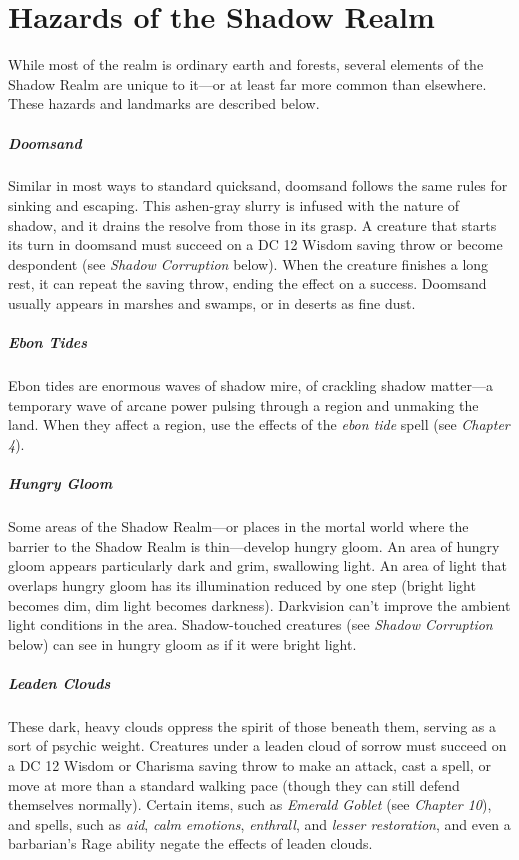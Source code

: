 \documentclass[10pt,a4paper,twoside,bg=print,twocolumn,openany,nodeprecatedcode]{dndbook}
\begin{document}
\section{Hazards of the Shadow Realm}
While most of the realm is ordinary earth and forests, several elements of the Shadow Realm are unique to it—or at least far more common than elsewhere. These hazards and landmarks are described below.

\subparagraph{Doomsand}
Similar in most ways to standard quicksand, doomsand follows the same rules for sinking and escaping. This ashen-gray slurry is infused with the nature of shadow, and it drains the resolve from those in its grasp. A creature that starts its turn in doomsand must succeed on a DC 12 Wisdom saving throw or become despondent (see \textit{Shadow Corruption} below). When the creature finishes a long rest, it can repeat the saving throw, ending the effect on a success. Doomsand usually appears in marshes and swamps, or in deserts as fine dust.

\subparagraph{Ebon Tides}
Ebon tides are enormous waves of shadow mire, of crackling shadow matter—a temporary wave of arcane power pulsing through a region and unmaking the land. When they affect a region, use the effects of the \textit{ebon tide} spell (see \textit{Chapter 4}).

\subparagraph{Hungry Gloom}
Some areas of the Shadow Realm—or places in the mortal world where the barrier to the Shadow Realm is thin—develop hungry gloom. An area of hungry gloom appears particularly dark and grim, swallowing light. An area of light that overlaps hungry gloom has its illumination reduced by one step (bright light becomes dim, dim light becomes darkness). Darkvision can't improve the ambient light conditions in the area. Shadow-touched creatures (see \textit{Shadow Corruption} below) can see in hungry gloom as if it were bright light.

\subparagraph{Leaden Clouds}
These dark, heavy clouds oppress the spirit of those beneath them, serving as a sort of psychic weight. Creatures under a leaden cloud of sorrow must succeed on a DC 12 Wisdom or Charisma saving throw to make an attack, cast a spell, or move at more than a standard walking pace (though they can still defend themselves normally). Certain items, such as \textit{Emerald Goblet} (see \textit{Chapter 10}), and spells, such as \textit{aid}, \textit{calm emotions}, \textit{enthrall}, and \textit{lesser restoration}, and even a barbarian's Rage ability negate the effects of leaden clouds.
\end{document}

